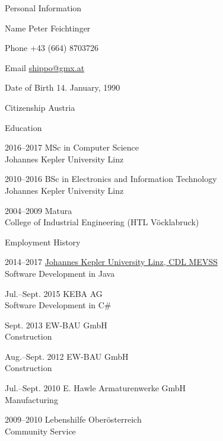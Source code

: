 \begin{cv}{}
  \begin{cvlist}{Personal Information}
    \setlength{\itemsep}{-0.4\baselineskip plus 1pt minus 1pt}
    \item[Name] Peter Feichtinger
    \item[Phone] +43 (664) 8703726
    \item[Email] \href{mailto:shippo@gmx.at}{shippo@gmx.at}
    \item[Date of Birth] 14. January, 1990
    \item[Citizenship] Austria
  \end{cvlist}
 
  \begin{cvlist}{Education}
    \item[2016--2017] MSc in Computer Science\\Johannes Kepler University Linz
    \item[2010--2016] BSc in Electronics and Information Technology\\Johannes Kepler University Linz
    \item[2004--2009] Matura\\College of Industrial Engineering (HTL Vöcklabruck)
  \end{cvlist}
  
  \begin{cvlist}{Employment History}
    \setlength{\itemsep}{-0.15\baselineskip plus 1pt minus 1pt}
    \item[2014--2017] \href{http://mevss.jku.at/?page_id=533}{Johannes Kepler University Linz, CDL MEVSS}\\
      Software Development in Java
    \item[Jul.--Sept. 2015] KEBA AG\\Software Development in C\#
    \item[Sept. 2013] EW-BAU GmbH\\Construction
    \item[Aug.--Sept. 2012] EW-BAU GmbH\\Construction
    \item[Jul.--Sept. 2010] E. Hawle Armaturenwerke GmbH\\Manufacturing
    \item[2009--2010] Lebenshilfe Oberösterreich\\Community Service
  \end{cvlist}
\end{cv}
